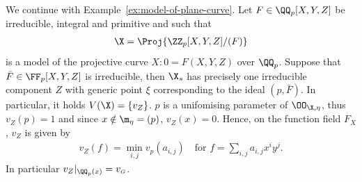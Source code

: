 \begin{example}
    We continue with Example~\ref{ex:model-of-plane-curve}.
    Let $F\in \QQ_p[X,Y,Z]$ be irreducible, integral and primitive and such that
    \begin{align}
        \X = \Proj{\ZZ_p[X,Y,Z]/(F)}
    \end{align}
    is a model of the projective curve $X: 0=F(X,Y,Z)$ over $\QQ_p$.
    Suppose that $\bar{F} \in \FF_p[X,Y,Z]$ is irreducible, then $\X_s$ has precisely one irreducible component $Z$
    with generic point $\xi$ corresponding to the ideal $(p, \bar{F})$.
    In particular, it holds $V(\X) = \lbrace v_Z\rbrace$. 
    $p$ is a unifomising parameter of $\OO_{\X, \eta}$, thus $v_Z(p)=1$ and since $x \notin \m_\eta=(p)$, $v_Z(x)=0$.
    Hence, on the function field $F_X$, $v_Z$ is given by 
    \begin{align}
        v_Z(f) = \min_{i,j}v_p(a_{i,j}) \quad \text{for } f = \sum_{i,j}a_{i,j}x^i y^j.
    \end{align}
    In particular $v_Z|_{\QQ_p(x)} = v_{\scriptscriptstyle G}$.
\end{example}

